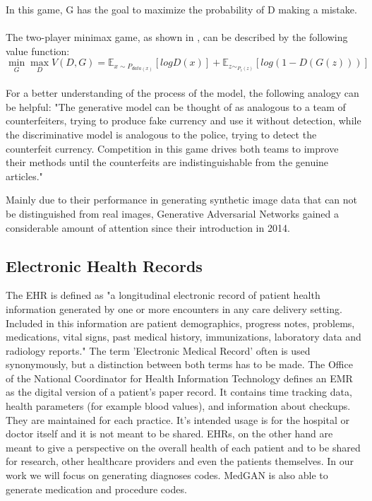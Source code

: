 \documentclass[11pt, a4paper]{book}
\begin{document}
In this game, G has the goal to maximize the probability of D making a mistake.  \cite{goodfellow2014generative}
\\
\\
The two-player minimax game, as shown in \cite{Goodfellow2014}, can be described by the following value function:
\\
\begin{equation}
	\min_G\max_DV(D,G) = \mathbb{E}_{x\sim{P_{data(x)}}}[log D(x)] + \mathbb{E}_{z\sim_{P_z(z)}}[log(1 - D(G(z)))]
\end{equation}
\\

For a better understanding of the process of the model, the following analogy can be helpful:
"The generative model can be thought of as analogous to a team of counterfeiters, trying  to  produce  fake  currency  and  use  it  without  detection,  while  the  discriminative  model  is analogous to the police, trying to detect the counterfeit currency.  Competition in this game drives both teams to improve their methods until the counterfeits are indistinguishable from the genuine articles." \cite{goodfellow2014generative}

Mainly due to their performance in generating synthetic image data that can not be distinguished from real images, Generative Adversarial Networks gained a considerable amount of attention since their introduction in 2014.


\subsection{Electronic Health Records}
The EHR is defined as "a longitudinal electronic record of patient health information generated by one or more encounters in any care delivery setting. Included in this information are patient demographics, progress notes, problems, medications, vital signs, past medical history, immunizations, laboratory data and radiology reports." \cite{HIMMS}
The term 'Electronic Medical Record' often is used synonymously, but a distinction between both terms has to be made.
The Office of the National Coordinator for Health Information Technology defines an EMR as the digital version of a patient's paper record. It contains time tracking data, health parameters (for example blood values), and information about checkups. They are maintained for each practice. It's intended usage is for the hospital or doctor itself and it is not meant to be shared. \cite{ONC}
EHRs, on the other hand are meant to give a perspective on the overall health of each patient and to be shared for research, other healthcare providers and even the patients themselves. \cite{ONC}
In our work we will focus on generating diagnoses codes. MedGAN is also able to generate medication and procedure codes.
\end{document}
